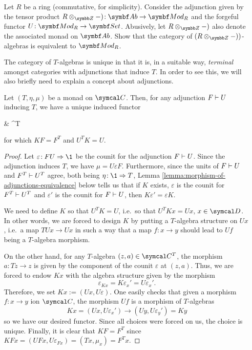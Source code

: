 \begin{exercise}
	Let \(R\) be a ring (commutative, for simplicity). Consider the adjunction given by the tensor product \(R\otimes_{\Z}-)\!:\Ab\to\Mod_R\) and the forgeful functor \(U\!:\Mod_R\to\Set\).
	Abusively, let \(R\otimes_{\Z}-)\) also denote the associated monad on \(\Ab\). Show that the category of \((R\otimes_{\Z}-))\)-algebras is equivalent to \(\Mod_R\).
\end{exercise}

The category of \(T\)-algebras is unique in that it is, in a suitable way, \emph{terminal} amongst categories with adjunctions that induce \(T\). In order to see this, we will also briefly
need to explain a concept about adjunctions.
\begin{proposition}
	Let \((T,\eta,\mu)\) be a monad on \(\calC\). Then, for any adjunction \(F\vdash U\) inducing \(T\), we have a unique induced functor
	\begin{diagram*}[column sep=huge, row sep=large]
		\calD\ar[r,dashed,"K"]\ar[d,bend left,"U",""{name=D,left}] & \calC^T\ar[dl,shift left, bend left=40, "U^T",""{name=B,above}] \\
		\calC\ar[u,bend left,"F",""{name=C,right}]\ar[ur,bend right=10,"F^T",""{name=A,right}]\ar[to=A,from=B,symbol=\vdash]\ar[to=C,from=D,symbol=\vdash]
	\end{diagram*}
	for which \(KF = F^T\) and \(U^T K = U\).
\end{proposition}
\begin{proof}
Let \(\varepsilon\!:FU\To\1\) be the counit for the adjunction \(F\vdash U\). Since the adjunction induces \(T\), we have \(\mu = U\varepsilon F\). Furthermore, since
the units of \(F\vdash U\) and \(F^T\vdash U^T\) agree, both being \(\eta\!:\1\To T\), Lemma \ref{lemma:morphism-of-adjunctions-equivalence} below tells us that if \(K\) exists,
\(\varepsilon\) is the counit for \(F^T\vdash U^T\) and \(\varepsilon'\) is the counit for \(F\vdash U\), then \(K\varepsilon' = \varepsilon K\).

We need to define \(K\) so that \(U^TK = U\), i.e.\ so that \(U^TKx = Ux\), \(x\in\calD\). In other words, we are forced to design \(K\) by putting a \(T\)-algebra structure on \(Ux\), i.e.\ a map \(TUx \to Ux\)
in such a way that a map \(f\!:x\to y\) should lead to \(Uf\) being a \(T\)-algebra morphism.

On the other hand, for any \(T\)-algebra \((z,a)\in\calC^T\), the morphism \(a\!:Tz\to z\) is given by the component of the counit \(\varepsilon\) at \((z,a)\). Thus, we are forced to endow \(Kx\) with the algebra
structure given by the morphism
\[ \varepsilon_{Kx} = K\varepsilon_x' = U\varepsilon_x'. \]
Therefore, we set \(Kx := (Ux,U\varepsilon)\). One easily checks that given a morphism \(f\!:x\to y\) ion \(\calC\), the morphism \(Uf\) is a morphism of \(T\)-algebras
\[ Kx = (Ux,U\varepsilon_x')\to(Uy,U\varepsilon_y') = Ky \]
so we have our desired functor. Since all choices were forced on us, the choice is unique. Finally, it is clear that \(KF = F^T\)
since \(KFx = (UFx, U\varepsilon_{Fx}) = (Tx, \mu_x) = F^Tx\).
\end{proof}

